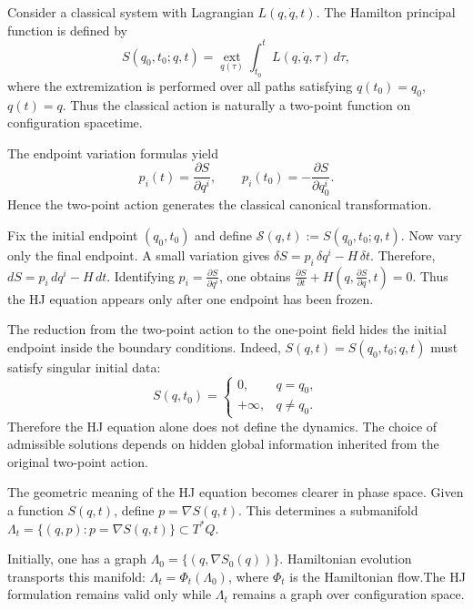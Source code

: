 Consider a classical system with Lagrangian
$L(q,\dot q,t)$.
The Hamilton principal function is defined by
\begin{equation}
S(q_0,t_0;q,t)=\operatorname*{ext}_{q(\tau)}
\int_{t_0}^{t} L(q,\dot q,\tau)\,d\tau,
\label{principal}
\end{equation}
where the extremization is performed over all paths satisfying
$q(t_0)=q_0$, $q(t)=q$.
Thus the classical action is naturally a two-point function on configuration spacetime.

The endpoint variation formulas yield
\begin{equation}
p_i(t)=\frac{\partial S}{\partial q^i},
\qquad
p_i(t_0)=-\frac{\partial S}{\partial q_0^i}.
\label{endpoint}
\end{equation}
Hence the two-point action generates the classical canonical transformation.

Fix the initial endpoint $(q_0,t_0)$ and define
$\mathcal S(q,t):=S(q_0,t_0;q,t)$.
Now vary only the final endpoint. A small variation gives
$\delta S=p_i\,\delta q^i - H\,\delta t$.
Therefore,
$dS = p_i\,dq^i - H\,dt$.
Identifying $p_i=\frac{\partial S}{\partial q^i}$,
one obtains $\frac{\partial S}{\partial t}+
H\left(q,\frac{\partial S}{\partial q},t\right)=0$.
Thus the HJ equation appears only after one endpoint has been frozen.

The reduction from the two-point action to the one-point field hides the
initial endpoint inside the boundary conditions.
Indeed, $S(q,t)=S(q_0,t_0;q,t)$
must satisfy singular initial data:
\begin{equation}
S(q,t_0)=
\begin{cases}
0, & q=q_0,\\
+\infty, & q\neq q_0.
\end{cases}
\end{equation}
Therefore the HJ equation alone does not define the dynamics. The choice of
admissible solutions depends on hidden global information inherited from the
original two-point action.

The geometric meaning of the HJ equation becomes clearer in phase space.
Given a function $S(q,t)$, define $p=\nabla S(q,t)$.
This determines a submanifold $\Lambda_t=\{(q,p):p=\nabla S(q,t)\}\subset T^*Q$.

Initially, one has a graph $\Lambda_0=\{(q,\nabla S_0(q))\}$.
Hamiltonian evolution transports this manifold: $\Lambda_t=\Phi_t(\Lambda_0)$,
where $\Phi_t$ is the Hamiltonian flow.The HJ formulation remains valid only 
while $\Lambda_t$ remains a graph over configuration space.

